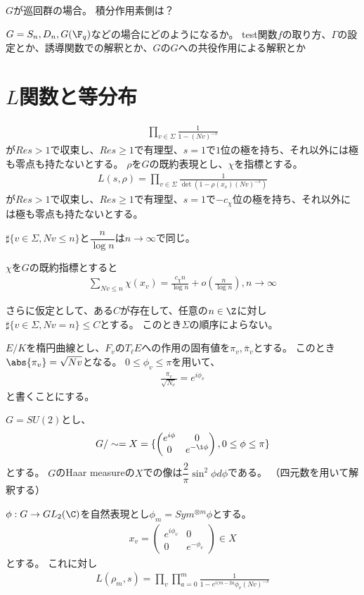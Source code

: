 \documentclass{jsarticle}
\begin{document}
$G$が巡回群の場合。
積分作用素側は？

$G=S_n, D_n, G(\F_q)$などの場合にどのようになるか。
test関数$f$の取り方、$\Gamma$の設定とか、誘導関数での解釈とか、$G$の$G$への共役作用による解釈とか

\section{$L$関数と等分布}
\begin{align*}
\prod_{v\in\Sigma}\frac{1}{1-(Nv)^{-s}} 
\end{align*}
が$Re s>1$で収束し、$Re s\geq 1$で有理型、$s=1$で$1$位の極を持ち、それ以外には極も零点も持たないとする。
$\rho$を$G$の既約表現とし、$\chi$を指標とする。
\begin{align*}
L(s,\rho)=\prod_{v\in\Sigma}\frac{1}{\det(1-\rho(x_v)(Nv)^{-s})}
\end{align*}
が$Re s>1$で収束し、$Re s\geq 1$で有理型、$s=1$で$-c_\chi$位の極を持ち、それ以外には極も零点も持たないとする。

\begin{thm}
$\sharp\{v\in\Sigma, Nv\leq n\}$と$\dfrac{n}{\log n}$は$n\to \infty$で同じ。

$\chi$を$G$の既約指標とすると
\begin{align*}
\sum_{Nv\leq n}\chi(x_v)=\frac{c_\chi n}{\log n}+o(\frac{n}{\log n}), n\to\infty
\end{align*}
\end{thm}

さらに仮定として、ある$C$が存在して、任意の$n\in\Z$に対し$\sharp\{v\in\Sigma,Nv=n\}\leq C$とする。
このとき$\Sigma$の順序によらない。

$E/K$を楕円曲線とし、$F_v$の$T_\ell E$への作用の固有値を$\pi_v, \bar{\pi}_v$とする。
このとき$\abs{\pi_v}=\sqrt{Nv}$となる。
$0\leq\phi_v\leq\pi$を用いて、
\begin{align*}
\frac{\pi_v}{\sqrt{N_v}}=e^{i\phi_v}
\end{align*}
と書くことにする。

$G=SU(2)$とし、
\begin{align*}
G/\sim=X=\{\begin{pmatrix}e^{i\phi}&0\\0&e^{-\i\phi}\end{pmatrix},0\leq\phi\leq\pi\}
\end{align*}
とする。
$G$のHaar measureの$X$での像は$\dfrac{2}{\pi}\sin^2\phi d\phi$である。
（四元数を用いて解釈する）

$\phi:G \to GL_2(\C)$を自然表現とし$\phi_m=Sym^{\otimes m}\phi$とする。
\begin{align*}
x_v=\begin{pmatrix}e^{i\phi_v}&0\\0&e^{-\phi_v}\end{pmatrix}\in X
\end{align*}
とする。
これに対し
\begin{align*}
L(\rho_m,s)=\prod_v\prod_{a=0}^m\frac{1}{1-e^{i(m-2a}\phi_v(Nv)^{-s}}
\end{align*}
\end{document}
